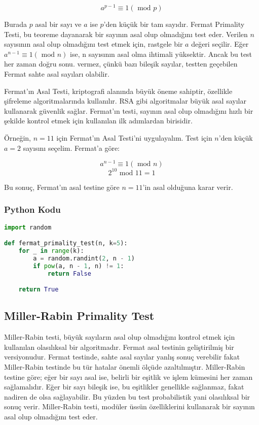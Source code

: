 \[ a^{p-1} \equiv 1 (\text{ mod } p) \]

Burada $p$ asal bir sayı ve $a$ ise $p$'den küçük bir tam sayıdır. Fermat Primality Testi, bu teoreme dayanarak bir sayının asal olup olmadığını test eder. Verilen $n$ sayısının asal olup olmadığını test etmek için, rastgele bir $a$ değeri seçilir. Eğer $a^{n-1} \equiv 1 (\text{ mod } n)$ ise, n sayısının asal olma ihtimali yüksektir. Ancak bu test her zaman doğru sonu. vermez, çünkü bazı bileşik sayılar, testten geçebilen Fermat sahte asal sayıları olabilir.

Fermat’ın Asal Testi, kriptografi alanında büyük öneme sahiptir, özellikle şifreleme algoritmalarında kullanılır. RSA gibi algoritmalar büyük asal sayılar kullanarak güvenlik sağlar. Fermat’ın testi, sayının asal olup olmadığını hızlı bir şekilde kontrol etmek için kullanılan ilk adımlardan birisidir.

Örneğin, $n = 11$ için Fermat'ın Asal Testi'ni uygulayalım. Test için $n$'den küçük $a = 2$ sayısını seçelim. Fermat'a göre:

\[ a^{n-1} \equiv 1 (\text{ mod } n) \]
\[ 2^10 \text{ mod } 11 = 1 \]

Bu sonuç, Fermat'ın asal testine göre $n = 11$'in asal olduğuna karar verir.

\subsubsection{Python Kodu}

\begin{lstlisting}[language=Python]
import random

def fermat_primality_test(n, k=5):
    for _ in range(k):
        a = random.randint(2, n - 1)
        if pow(a, n - 1, n) != 1:
            return False

    return True
\end{lstlisting}

\newpage

\subsection{Miller-Rabin Primality Test}

Miller-Rabin testi, büyük sayıların asal olup olmadığını kontrol etmek için kullanılan olasılıksal bir algoritmadır. Fermat asal testinin geliştirilmiş bir versiyonudur. Fermat testinde, sahte asal sayılar yanlış sonuç verebilir fakat Miller-Rabin testinde bu tür hatalar önemli ölçüde azaltılmıştır. Miller-Rabin testine göre; eğer bir sayı asal ise, belirli bir eşitlik ve işlem kümesini her zaman sağlamalıdır. Eğer bir sayı bileşik ise, bu eşitlikler genellikle sağlanmaz, fakat nadiren de olsa sağlayabilir. Bu yüzden bu test probabilistik yani olasılıksal bir sonuç verir. Miller-Rabin testi, modüler üssün özelliklerini kullanarak bir sayının asal olup olmadığını test eder.

